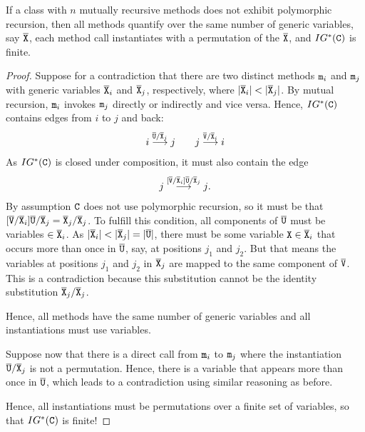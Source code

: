 \begin{proposition}\label{prop:polymorphi-recursion}
  If a class  with $n$ mutually recursive methods does not exhibit
  polymorphic recursion, then all methods quantify over the
  same number of generic variables, say $\overline{\tt X}$, each method call
  instantiates with a permutation of the $\overline{\tt X}$, and $IG^* ({\tt C})$ is finite.
\end{proposition}
\begin{proof}
  Suppose for a contradiction that there are two distinct methods ${\tt m}_i$ and
  ${\tt m}_j$ with generic variables $\overline{\tt X}_i$ and $\overline{\tt X}_j$, respectively,
  where $|\overline{\tt X}_i| < |\overline{\tt X}_j|$. By mutual recursion, ${\tt m}_i$ invokes
  ${\tt m}_j$ directly or indirectly and vice versa. Hence, $IG^* ({\tt C})$
  contains edges from $i$ to $j$ and back:
  \begin{gather*}
    i \stackrel{\overline{\tt U}/\overline{\tt X}_j}{\longrightarrow} j
    \qquad
    j \stackrel{\overline{\tt V}/\overline{\tt X}_i}{\longrightarrow} i
  \end{gather*}
  As $IG^*({\tt C})$ is closed under composition, it must also contain
  the edge
  \begin{gather*}
    j \stackrel{[\overline{\tt V}/\overline{\tt X}_i]\overline{\tt U}/\overline{\tt X}_j}{\longrightarrow} j
    \text{.}
  \end{gather*}
  By assumption ${\tt C}$ does not use polymorphic recursion, so it
  must be that $[\overline{\tt V}/\overline{\tt X}_i]\overline{\tt U}/\overline{\tt X}_j =
  \overline{\tt X}_j/\overline{\tt X}_j$. To fulfill this condition, all components of
  $\overline{\tt U}$ must be variables $\in \overline{\tt X}_i$. As  $|\overline{\tt X}_i| <
  |\overline{\tt X}_j| = |\overline{\tt U}|$, there must be some variable ${\tt X} \in \overline{\tt X}_i$ that
  occurs more than once in $\overline{\tt U}$, say, at positions $j_1$ and $j_2$. 
  But that means the variables at positions $j_1$ and $j_2$ in
  $\overline{\tt X}_j$ are mapped to the same component of $\overline{\tt V}$. This is a
  contradiction because this substitution cannot be the identity
  substitution $\overline{\tt X}_j/\overline{\tt X}_j$.

  Hence, all methods have the same number of generic variables and all
  instantiations must use variables.

  Suppose now that there is a direct call from ${\tt m}_i$ to
  ${\tt m}_j$ where the instantiation $\overline{\tt U}/\overline{\tt X}_j$ is not a permutation. Hence,
  there is a variable that appears more than once in $\overline{\tt U}$, which
  leads to a contradiction using similar reasoning as before.

  Hence, all instantiations must be permutations over a finite set of
  variables, so that $IG^*({\tt C})$ is finite! 
\end{proof}

